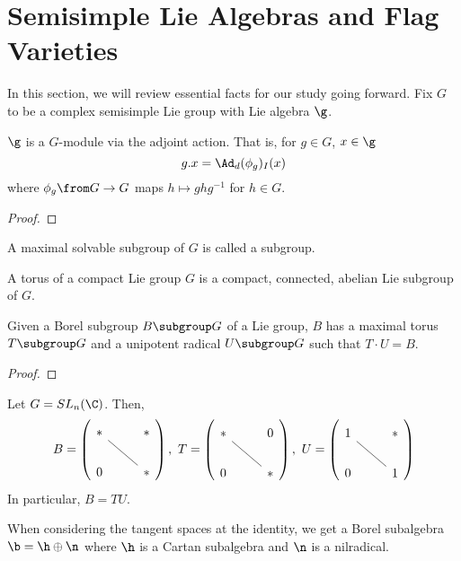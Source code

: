\section{Semisimple Lie Algebras and Flag Varieties}
 In this section, we will review essential facts for our study going
 forward. Fix \(G\) to be a complex semisimple Lie group with Lie algebra
 \(\g\).
 \begin{prop}
   \(\g\) is a \(G\)-module via the adjoint action. That is, for \(g
   \in G\), \(x \in \g\) \[
     g.x = \Ad_ d(\phi_g)_I(x)
   \]
   where \(\phi_g\from G \to G\) maps \(h \mapsto ghg^{-1}\) for \(h
   \in G\).
 \end{prop}
 \begin{proof}
 \end{proof}
 \begin{defn}
   A maximal solvable subgroup of \(G\) is called a  subgroup.
 \end{defn}
 \begin{defn}
   A torus of a compact Lie group \(G\) is a compact, connected,
   abelian Lie subgroup of \(G\).
 \end{defn}
 \begin{prop}
   Given a Borel subgroup \(B \subgroup G\) of a Lie group, \(B\) has
   a maximal torus \(T \subgroup G\) and a unipotent radical \(U
   \subgroup G\) such that \(T \cdot U = B\). 
 \end{prop}
 \begin{proof}
 \end{proof}
 \begin{example}
   Let \(G = SL_n(\C)\). Then, \[
     B = \left(
       \begin{tikzcd}
         * \arrow[rd, dash] & * \\
         0 & *
       \end{tikzcd}
     \right), \
     T = \left(
       \begin{tikzcd}
         * \arrow[rd, dash] & 0 \\
         0 & *
       \end{tikzcd}
     \right), \
     U = \left(
       \begin{tikzcd}
         1 \arrow[rd, dash] & * \\
         0 & 1
       \end{tikzcd}
     \right)
   \]
   In particular, \(B = TU\).
 \end{example}
 \begin{defn}
   When considering the tangent spaces at the identity, we get
   a Borel subalgebra \(\b = \h \oplus \n\) where \(\h\) is a Cartan
   subalgebra and \(\n\) is a nilradical. 
 \end{defn}
